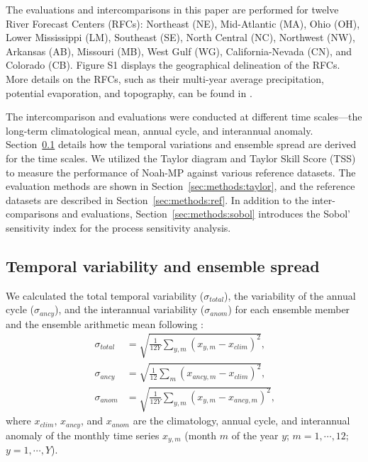 \documentclass[essd, manuscript]{copernicus}
\begin{document}
The evaluations and intercomparisons in this paper are performed for twelve River Forecast Centers (RFCs): Northeast (NE), Mid-Atlantic (MA), Ohio (OH), Lower Mississippi (LM), Southeast (SE), North Central (NC), Northwest (NW), Arkansas (AB), Missouri (MB), West Gulf (WG), California-Nevada (CN), and Colorado (CB). Figure S1 displays the geographical delineation of the RFCs. More details on the RFCs, such as their multi-year average precipitation, potential evaporation, and topography, can be found in \citet[Figure 1]{fei2021WRR}.

The intercomparison and evaluations were conducted at different time scales---the long-term climatological mean, annual cycle, and interannual anomaly. Section~\ref{sec:methods:variation} details how the temporal variations and ensemble spread are derived for the time scales. We utilized the Taylor diagram and Taylor Skill Score (TSS) to measure the performance of Noah-MP against various reference datasets. The evaluation methods are shown in Section~\ref{sec:methods:taylor}, and the reference datasets are described in Section~\ref{sec:methods:ref}. In addition to the inter-comparisons and evaluations, Section~\ref{sec:methods:sobol} introduces the Sobol' sensitivity index for the process sensitivity analysis.

\subsection{Temporal variability and ensemble spread}\label{sec:methods:variation}

We calculated the total temporal variability (\(\sigma_{total}\)), the variability of the annual cycle (\(\sigma_{ancy}\)), and the interannual variability (\(\sigma_{anom}\)) for each ensemble member and the ensemble arithmetic mean following \citet{dirmeyer2006BAMS}:
\begin{align}
  \sigma_{total} & = \sqrt{\frac{1}{12 Y}\sum_{y,m} (x_{y,m} - x_{clim})^2}
  \text{,}
  \label{eq:var:total} \\
  \sigma_{ancy}  & = \sqrt{\frac{1}{12}\sum_{m} (x_{ancy,m} - x_{clim})^2}
  \text{,} \\
  \sigma_{anom}  & = \sqrt{\frac{1}{12 Y} \sum_{y,m} (x_{y,m} - x_{ancy,m})^2}
  \text{,}
\end{align}
where \(x_{clim}\), \(x_{ancy}\), and \(x_{anom}\) are the climatology, annual cycle, and interannual anomaly of the monthly time series \(x_{y,m}\) (month \(m\) of the year \(y\); \(m=1, \cdots, 12\); \(y=1, \cdots, Y\)).
\end{document}
